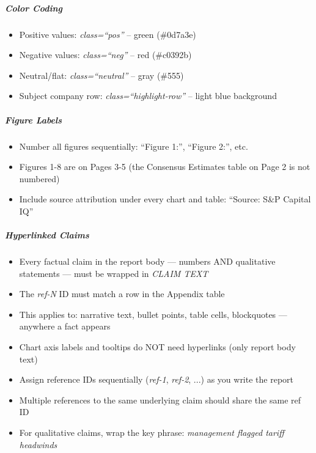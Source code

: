 \documentclass[11pt]{article}
\begin{document}
\subparagraph{Color Coding}\mbox{}\par
\begin{itemize}[leftmargin=*,itemsep=2pt,topsep=2pt]
\item {} Positive values: \emph{class=``pos''} -- green (\#0d7a3e)
\item {} Negative values: \emph{class=``neg''} -- red (\#c0392b)
\item {} Neutral/flat: \emph{class=``neutral''} -- gray (\#555)
\item {} Subject company row: \emph{class=``highlight-row''} -- light blue background
\end{itemize}

\subparagraph{Figure Labels}\mbox{}\par
\begin{itemize}[leftmargin=*,itemsep=2pt,topsep=2pt]
\item {} Number all figures sequentially: ``Figure 1:'', ``Figure 2:'', etc.
\item {} Figures 1-8 are on Pages 3-5 (the Consensus Estimates table on Page 2 is not numbered)
\item {} Include source attribution under every chart and table: ``Source: S\&P Capital IQ''
\end{itemize}

\subparagraph{Hyperlinked Claims}\mbox{}\par
\begin{itemize}[leftmargin=*,itemsep=2pt,topsep=2pt]
\item {} Every factual claim in the report body — numbers AND qualitative statements — must be wrapped in \emph{CLAIM TEXT}
\item {} The \emph{ref-N} ID must match a row in the Appendix table
\item {} This applies to: narrative text, bullet points, table cells, blockquotes — anywhere a fact appears
\item {} Chart axis labels and tooltips do NOT need hyperlinks (only report body text)
\item {} Assign reference IDs sequentially (\emph{ref-1}, \emph{ref-2}, ...) as you write the report
\item {} Multiple references to the same underlying claim should share the same ref ID
\item {} For qualitative claims, wrap the key phrase: \emph{management flagged tariff headwinds}
\end{itemize}
\end{document}
